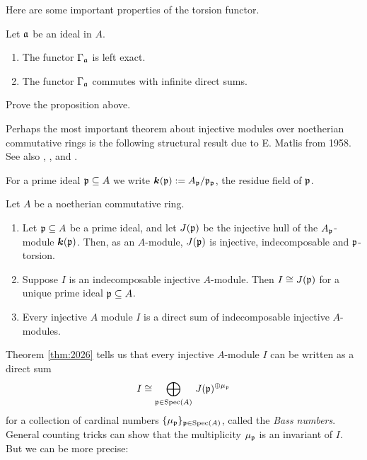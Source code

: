 Here are some important properties of the torsion functor.

\begin{prop} \label{prop:3085}
Let $\mathfrak{a}$ be an ideal in $A$. 
\begin{enumerate}
\item The functor $\Gamma_{\mathfrak{a}}$ is left exact. 

\item The functor $\Gamma_{\mathfrak{a}}$ commutes with infinite direct sums. 
\end{enumerate}
\end{prop}

\begin{exer} \label{exer:3085}
Prove the proposition above. 
\end{exer}

Perhaps the most important theorem about injective modules over 
noetherian commutative rings is the following structural result due to E. 
Matlis \cite{Matl} from 1958. See also \cite[Section V.4]{Ste}, 
\cite[Sections 3.F and 3.I]{Lam}, \cite[Section 18]{Mats} and \cite{BrSh}.

For a prime ideal $\mathfrak{p} \subseteq A$ we write 
$\boldsymbol{k}(\mathfrak{p}) := A_{\mathfrak{p}} / \mathfrak{p}_{\mathfrak{p}}$, the residue field of $\mathfrak{p}$. 

\begin{thm}[Matlis] \label{thm:2026}
Let $A$ be a noetherian commutative ring. 
\begin{enumerate}
\item Let $\mathfrak{p} \subseteq A$ be a prime ideal, and let $J(\mathfrak{p})$ be the injective hull 
of the $A_{\mathfrak{p}}$-module $\boldsymbol{k}(\mathfrak{p})$. Then, as an $A$-module, $J(\mathfrak{p})$ is
injective, indecomposable and $\mathfrak{p}$-torsion. 

\item Suppose $I$ is an indecomposable injective $A$-module. Then 
$I \cong J(\mathfrak{p})$ for a unique prime ideal $\mathfrak{p} \subseteq A$. 

\item Every injective $A$ module $I$ is a direct sum of indecomposable 
injective $A$-modules. 
\end{enumerate}
\end{thm}

Theorem \ref{thm:2026} tells us that every injective $A$-module $I$ can be 
written as a direct sum 
\begin{equation} \label{eqn:2215}
I \cong \bigoplus_{\mathfrak{p} \in \operatorname{Spec}(A)} \, J(\mathfrak{p})^{\oplus \mu_{\mathfrak{p}}} 
\end{equation}
for a collection of cardinal numbers 
$\{ \mu_{\mathfrak{p}} \}_{\mathfrak{p} \in \operatorname{Spec}(A)}$, called the {\em Bass numbers}. 
General counting tricks can show that the multiplicity $\mu_{\mathfrak{p}}$ is an 
invariant of $I$. But we can be more precise: 

